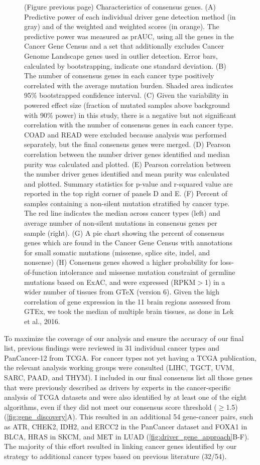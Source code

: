 \begin{figure} [t!]
\caption[(continued) Characteristics of consensus genes.]{(Figure previous page) Characteristics of consensus genes. (A) Predictive power of each individual driver gene detection method (in gray) and of the weighted and weighted scores (in orange). The predictive power was measured as prAUC, using all the genes in the Cancer Gene Census and a set that additionally excludes Cancer Genome Landscape genes used in outlier detection. Error bars, calculated by bootstrapping, indicate one standard deviation. (B) The number of consensus genes in each cancer type positively correlated with the average mutation burden. Shaded area indicates 95\% bootstrapped confidence interval. (C) Given the variability in powered effect size (fraction of mutated samples above background with 90\% power) in this study, there is a negative but not significant correlation with the number of consensus genes in each cancer type. COAD and READ were excluded because analysis was performed separately, but the final consensus genes were merged. (D) Pearson correlation between the number driver genes identified and median purity was calculated and plotted. (E) Pearson correlation between the number driver genes identified and mean purity was calculated and plotted. Summary statistics for p-value and r-squared value are reported in the top right corner of panels D and E. (F) Percent of samples containing a non-silent mutation stratified by cancer type. The red line indicates the median across cancer types (left) and average number of non-silent mutations in consensus genes per sample (right). (G) A pie chart showing the percent of consensus genes which are found in the Cancer Gene Census with annotations for small somatic mutations (missense, splice site, indel, and nonsense) (H) Consensus genes showed a higher probability for loss-of-function intolerance and missense mutation constraint of germline mutations based on ExAC, and were expressed (RPKM$>$1) in a wider number of tissues from GTeX (version 6). Given the high correlation of gene expression in the 11 brain regions assessed from GTEx, we took the median of multiple brain tissues, as done in Lek et al., 2016.}
\end{figure}

To maximize the coverage of our analysis and ensure the accuracy of our final list, previous findings were reviewed in 31 individual cancer types and PanCancer-12 from TCGA. For cancer types not yet having a TCGA publication, the relevant analysis working groups were consulted (LIHC, TGCT, UVM, SARC, PAAD, and THYM). I included in our final consensus list all those genes that were previously described as drivers by experts in the cancer-specific analysis of TCGA datasets and were also identified by at least one of the eight algorithms, even if they did not meet our consensus score threshold ($\geq$1.5)(\autoref{fig:gene_discovery}A). This resulted in an additional 54 gene-cancer pairs, such as ATR, CHEK2, IDH2, and ERCC2 in the PanCancer dataset and FOXA1 in BLCA, HRAS in SKCM, and MET in LUAD (\autoref{fig:driver_gene_approach}B-F). The majority of this effort resulted in linking cancer genes identified by our strategy to additional cancer types based on previous literature (32/54).  

